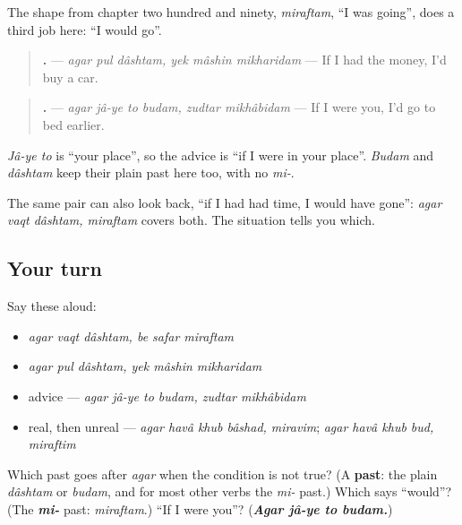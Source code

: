 \begin{grammarlens}[title={Grammar Lens: the mi- past as \textquotedblleft{}would\textquotedblright{}}]
The shape from chapter two hundred and ninety, \emph{miraftam}, \textquotedblleft{}I was going\textquotedblright{}, does a third job here: \textquotedblleft{}I would go\textquotedblright{}.

\begin{quote}
\textbf{     .} — \emph{agar pul dâshtam, yek mâshin mikharidam} — If I had the money, I'd buy a car.
\end{quote}

\begin{quote}
\textbf{     .} — \emph{agar jâ-ye to budam, zudtar mikhâbidam} — If I were you, I'd go to bed earlier.
\end{quote}

\emph{Jâ-ye to} is \textquotedblleft{}your place\textquotedblright{}, so the advice is \textquotedblleft{}if I were in your place\textquotedblright{}. \emph{Budam} and \emph{dâshtam} keep their plain past here too, with no \emph{mi-}.

The same pair can also look back, \textquotedblleft{}if I had had time, I would have gone\textquotedblright{}: \emph{agar vaqt dâshtam, miraftam} covers both. The situation tells you which.
\end{grammarlens}

\subsection*{Your turn}
Say these aloud:

\begin{itemize}
\raggedright
  \item \emph{agar vaqt dâshtam, be safar miraftam}
  \item \emph{agar pul dâshtam, yek mâshin mikharidam}
  \item advice — \emph{agar jâ-ye to budam, zudtar mikhâbidam}
  \item real, then unreal — \emph{agar havâ khub bâshad, miravim}; \emph{agar havâ khub bud, miraftim}
\end{itemize}

\begin{tcolorbox}[breakable,colback=teal!4,colframe=teal!35!black,title={Before you move on}]
Which past goes after \emph{agar} when the condition is not true? (A \textbf{past}: the plain \emph{dâshtam} or \emph{budam}, and for most other verbs the \emph{mi-} past.) Which says \textquotedblleft{}would\textquotedblright{}? (The \emph{\textbf{mi-}} past: \emph{miraftam}.) \textquotedblleft{}If I were you\textquotedblright{}? (\emph{\textbf{Agar jâ-ye to budam.}})
\end{tcolorbox}
